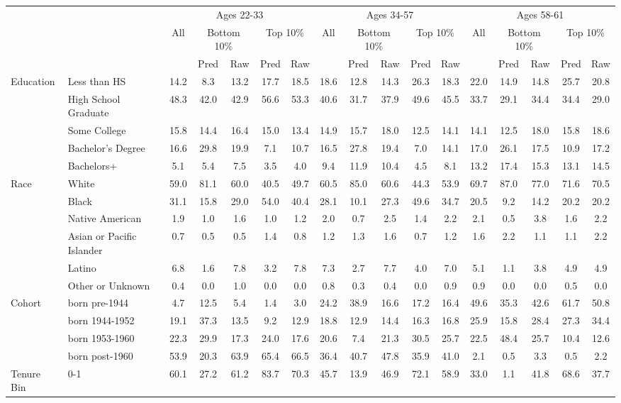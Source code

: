 \begin{tabular}{llccccc|ccccc|ccccc}
\hline\hline
 & & \multicolumn{5}{c|}{Ages 22-33} & \multicolumn{5}{c|}{Ages 34-57} & \multicolumn{5}{c}{Ages 58-61} \\
 & & All & \multicolumn{2}{c}{Bottom 10\%} & \multicolumn{2}{c|}{Top 10\%} & All & \multicolumn{2}{c}{Bottom 10\%} & \multicolumn{2}{c|}{Top 10\%} & All & \multicolumn{2}{c}{Bottom 10\%} & \multicolumn{2}{c}{Top 10\%} \\
 & & & Pred & Raw & Pred & Raw & & Pred & Raw & Pred & Raw & & Pred & Raw & Pred & Raw \\
\hline
Education&Less than HS&14.2&8.3&13.2&17.7&18.5&18.6&12.8&14.3&26.3&18.3&22.0&14.9&14.8&25.7&20.8\\
&High School Graduate&48.3&42.0&42.9&56.6&53.3&40.6&31.7&37.9&49.6&45.5&33.7&29.1&34.4&34.4&29.0\\
&Some College&15.8&14.4&16.4&15.0&13.4&14.9&15.7&18.0&12.5&14.1&14.1&12.5&18.0&15.8&18.6\\
&Bachelor's Degree&16.6&29.8&19.9&7.1&10.7&16.5&27.8&19.4&7.0&14.1&17.0&26.1&17.5&10.9&17.2\\
&Bachelors+&5.1&5.4&7.5&3.5&4.0&9.4&11.9&10.4&4.5&8.1&13.2&17.4&15.3&13.1&14.5\\
Race&White&59.0&81.1&60.0&40.5&49.7&60.5&85.0&60.6&44.3&53.9&69.7&87.0&77.0&71.6&70.5\\
&Black&31.1&15.8&29.0&54.0&40.4&28.1&10.1&27.3&49.6&34.7&20.5&9.2&14.2&20.2&20.2\\
&Native American&1.9&1.0&1.6&1.0&1.2&2.0&0.7&2.5&1.4&2.2&2.1&0.5&3.8&1.6&2.2\\
&Asian or Pacific Islander&0.7&0.5&0.5&1.4&0.8&1.2&1.3&1.6&0.7&1.2&1.6&2.2&1.1&1.1&2.2\\
&Latino&6.8&1.6&7.8&3.2&7.8&7.3&2.7&7.7&4.0&7.0&5.1&1.1&3.8&4.9&4.9\\
&Other or Unknown&0.4&0.0&1.0&0.0&0.0&0.8&0.3&0.4&0.0&0.9&0.9&0.0&0.0&0.5&0.0\\
Cohort&born pre-1944&4.7&12.5&5.4&1.4&3.0&24.2&38.9&16.6&17.2&16.4&49.6&35.3&42.6&61.7&50.8\\
&born 1944-1952&19.1&37.3&13.5&9.2&12.9&18.8&12.9&14.4&16.3&16.8&25.9&15.8&28.4&27.3&34.4\\
&born 1953-1960&22.3&29.9&17.3&24.0&17.6&20.6&7.4&21.3&30.5&25.7&22.5&48.4&25.7&10.4&12.6\\
&born post-1960&53.9&20.3&63.9&65.4&66.5&36.4&40.7&47.8&35.9&41.0&2.1&0.5&3.3&0.5&2.2\\
Tenure Bin&0-1&60.1&27.2&61.2&83.7&70.3&45.7&13.9&46.9&72.1&58.9&33.0&1.1&41.8&68.6&37.7\\

\end{tabular}
